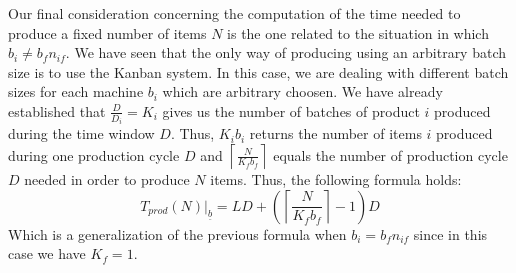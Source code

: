 Our final consideration concerning the computation of the time needed to produce a fixed number of items $N$ is the one related to the situation in which $b_i\ne b_fn_{if}$. We have seen that the only way of producing using an arbitrary batch size is to use the Kanban system. In this case, we are dealing with different batch sizes for each machine $b_i$ which are arbitrary choosen. We have already established that $\frac{D}{D_i}=K_i$ gives us the number of batches of product $i$ produced during the time window $D$. Thus, $K_ib_i$ returns the number of items $i$ produced during one production cycle $D$ and $\left\lceil \frac{N}{K_fb_f} \right\rceil$ equals the number of production cycle $D$ needed in order to produce $N$ items. Thus, the following formula holds:  
\[
    T_{prod}(N)|_{\underline b} = LD + \left(\left\lceil \frac{N}{K_fb_f} \right\rceil - 1\right)D
\]
Which is a generalization of the previous formula when $b_i = b_fn_{if}$ since in this case we have $K_f = 1$. 